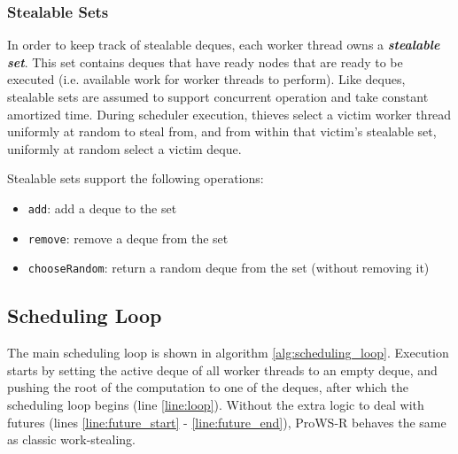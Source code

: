 \documentclass[bsc,frontabs,singlespacing,parskip,deptreport,normalheadings]{infthesis}
\begin{document}
\subsubsection*{Stealable Sets}
\label{subsubsection:stealable_sets}

In order to keep track of stealable deques, each worker thread owns a
\textbf{\textit{stealable set}}. This set contains deques that have ready nodes
that are ready to be executed (i.e. available work for worker threads to
perform). Like deques, stealable sets are assumed to support concurrent
operation and take constant amortized time. During scheduler execution, thieves
select a victim worker thread uniformly at random to steal from, and from within
that victim's stealable set, uniformly at random select a victim deque.

Stealable sets support the following operations:

\begin{itemize}
    \item \texttt{add}: add a deque to the set
    \item \texttt{remove}: remove a deque from the set
    \item \texttt{chooseRandom}: return a random deque from the set (without
        removing it)
\end{itemize}

\subsection{Scheduling Loop}
\label{subsection:scheduling_loop}

The main scheduling loop is shown in algorithm \ref{alg:scheduling_loop}.
Execution starts by setting the active deque of all worker threads to an empty
deque, and pushing the root of the computation to one of the deques, after which
the scheduling loop begins (line \ref{line:loop}).
Without the extra logic to deal with futures (lines \ref{line:future_start} -
\ref{line:future_end}), ProWS-R behaves the same as classic work-stealing.
\end{document}
